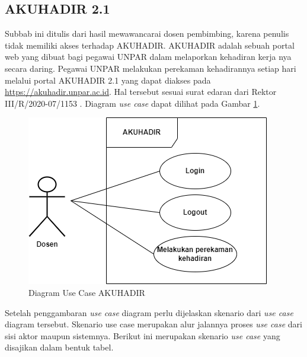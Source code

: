 \subsection{AKUHADIR 2.1}\vspace{-0.2cm}
\label{sec:akuhadir}
Subbab ini ditulis dari hasil mewawancarai dosen pembimbing, karena penulis tidak memiliki akses terhadap AKUHADIR. AKUHADIR adalah sebuah portal web yang dibuat bagi pegawai UNPAR dalam melaporkan kehadiran kerja nya secara daring. Pegawai UNPAR melakukan perekaman kehadirannya setiap hari melalui portal AKUHADIR 2.1 yang dapat diakses pada \url{https://akuhadir.unpar.ac.id}. Hal tersebut sesuai surat edaran dari Rektor III/R/2020-07/1153 \cite{akuhadir}. Diagram \textit{use case} dapat dilihat pada Gambar \ref{fig:usecaseDosen}.
\begin{figure}[H] \vspace{-0.35cm}
	\centering
	\includegraphics[scale=0.5]{Gambar/usecaseDosen.png}
	\caption{Diagram Use Case AKUHADIR} 
	\label{fig:usecaseDosen}
\end{figure}

Setelah penggambaran \textit{use case} diagram perlu dijelaskan skenario dari \textit{use case} diagram tersebut. Skenario use case merupakan alur jalannya proses \textit{use case} dari sisi aktor maupun sistemnya. Berikut ini merupakan skenario \textit{use case} yang disajikan dalam bentuk tabel.

